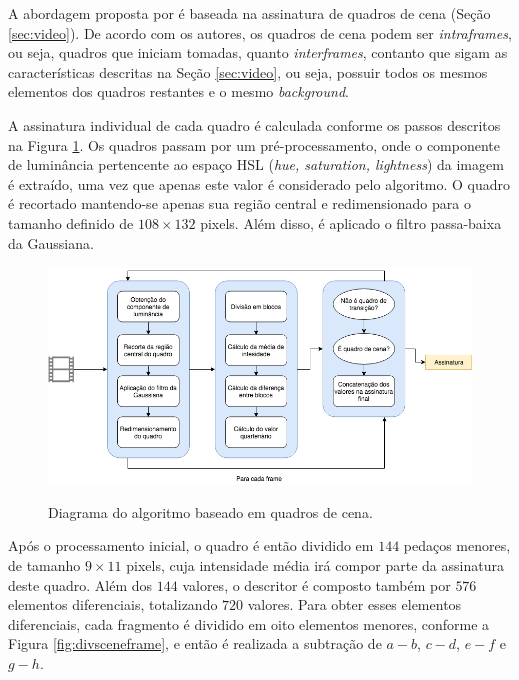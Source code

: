   A abordagem proposta por  é baseada na assinatura de quadros de cena (Seção \ref{sec:video}). De acordo com os autores, os quadros de cena podem ser \textit{intraframes}, ou seja, quadros que iniciam tomadas, quanto \textit{interframes}, contanto que sigam as características descritas na Seção \ref{sec:video}, ou seja, possuir todos os mesmos elementos dos quadros restantes e o mesmo \textit{background}.

A assinatura individual de cada quadro é calculada conforme os passos descritos na Figura \ref{fig:dia_sceneframe}. Os quadros passam por um pré-processamento, onde o componente de luminância pertencente ao espaço HSL (\textit{hue, saturation, lightness}) da imagem é extraído, uma vez que apenas este valor é considerado pelo algoritmo. O quadro é recortado mantendo-se apenas sua região central e redimensionado para o tamanho definido de $108\times132$ pixels. Além disso, é aplicado o filtro passa-baixa da Gaussiana.

\begin{figure}[h]
  \centering
  \caption{Diagrama do algoritmo baseado em quadros de cena.}
  \includegraphics[width=\textwidth]{dados/figuras/diagramas/Diag-SceneFrame}
  \label{fig:dia_sceneframe}
\end{figure}

Após o processamento inicial, o quadro é então dividido em $144$ pedaços menores, de tamanho $9\times11$ pixels, cuja intensidade média irá compor parte da assinatura deste quadro. Além dos $144$ valores, o descritor é composto também por $576$ elementos diferenciais, totalizando $720$ valores. Para obter esses elementos diferenciais, cada fragmento é dividido em oito elementos menores, conforme a Figura \ref{fig:divsceneframe}, e então é realizada a subtração de $a - b$, $c - d$, $e - f$ e $g - h$.

